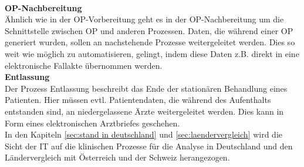 	\vspace{\parheadvspace}\\
	\textbf{OP-Nachbereitung}\\
		Ähnlich wie in der OP-Vorbereitung geht es in der OP-Nachbereitung um die Schnittstelle zwischen OP und anderen Prozessen. Daten, die während einer OP generiert wurden, sollen an nachstehende Prozesse weitergeleitet werden. Dies so weit wie möglich zu automatisieren, gelingt, indem diese Daten z.B. direkt in eine elektronische Fallakte übernommen werden.
	\vspace{\parheadvspace}\\
	\textbf{Entlassung}\\
		Der Prozess Entlassung beschreibt das Ende der stationären Behandlung eines Patienten. Hier müssen evtl. Patientendaten, die während des Aufenthalts entstanden sind, an niedergelassene Ärzte weitergeleitet werden. Dies kann in Form eines elektronischen Arztbriefes geschehen.\\

In den Kapiteln \ref{sec:stand in deutschland} und \ref{sec:laendervergleich} wird die Sicht der IT auf die klinischen Prozesse für die Analyse in Deutschland und den Ländervergleich mit Österreich und der Schweiz herangezogen.
